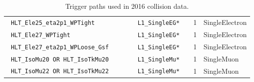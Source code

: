 \begin{table}[h]
\begin{tabular}{|l|l|c|l|}
\verb| HLT_Ele25_eta2p1_WPTight                        | & \verb| L1_SingleEG*         |  & 1 & SingleElectron \\
\verb| HLT_Ele27_WPTight                               | & \verb| L1_SingleEG*         |  & 1 & SingleElectron \\
\verb| HLT_Ele27_eta2p1_WPLoose_Gsf                    | & \verb| L1_SingleEG*         |  & 1 & SingleElectron \\
\verb| HLT_IsoMu20 OR HLT_IsoTkMu20                    | & \verb| L1_SingleMu*         |  & 1 & SingleMuon \\
\verb| HLT_IsoMu22 OR HLT_IsoTkMu22                    | & \verb| L1_SingleMu*         |  & 1 & SingleMuon \\
\hline %
    \end{tabular}
\small
    \caption{Trigger paths used in 2016 collision data.}
    \label{tab:triggerPaths}
\end{table}

	
	
